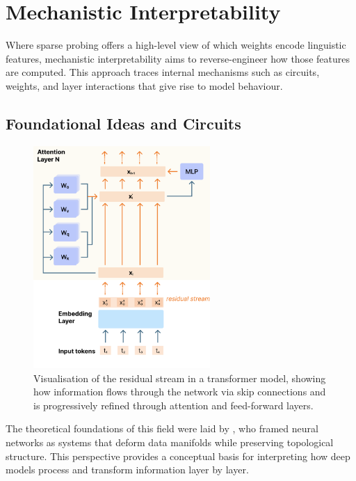 \section{Mechanistic Interpretability}

Where sparse probing offers a high-level view of which weights encode linguistic features, mechanistic interpretability aims to reverse-engineer how those features are computed. This approach traces internal mechanisms such as circuits, weights, and layer interactions that give rise to model behaviour. 

\subsection{Foundational Ideas and Circuits}

\begin{figure}[ht!]
    \centering
    \includegraphics[width=0.6\textwidth]{chapters/analysis_background/figures/residual_stream_visualization.pdf}
    \caption{Visualisation of the residual stream in a transformer model, showing how information flows through the network via skip connections and is progressively refined through attention and feed-forward layers.}
    \label{fig:residual-stream}
\end{figure}


The theoretical foundations of this field were laid by \citet{olah2014manifolds}, who framed neural networks as systems that deform data manifolds while preserving topological structure. This perspective provides a conceptual basis for interpreting how deep models process and transform information layer by layer.

